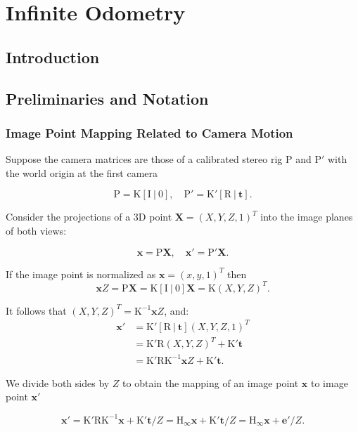 \chapter{Infinite Odometry}

\section{Introduction}


\section{Preliminaries and Notation}

\subsection{Image Point Mapping Related to Camera Motion}

Suppose the camera matrices are those of a calibrated stereo rig
$\mathrm{P}$ and $\mathrm{P}'$ with the world origin at the first
camera

\begin{equation}
\mathrm{P = K[I\ |\ 0],\quad P'=K'[R\ |\ \mathbf{t}]}.
\end{equation}

Consider the projections of a 3D point $\mathbf{X}=(X,Y,Z,1)^T$ into the image
planes of both views:

\begin{equation}
\mathrm{\mathbf{x} = P\mathbf{X}, \quad \mathbf{x}' = P'\mathbf{X}}.
\end{equation}

If the image point is normalized as $\mathbf{x} = (x,y,1)^T$ then
\[
\mathbf{x}Z = \mathrm{P\mathbf{X} = K[I\ |\ 0]\mathbf{X} = K}(X,Y,Z)^T.
\]

It follows that $(X,Y,Z)^T = \mathrm{K^{-1}}\mathbf{x}Z$, and:
\begin{align}
  \mathbf{x}' &= \mathrm{K'[R\ |\ \mathbf{t}]}(X,Y,Z,1)^T \\
  &= \mathrm{K'R}(X,Y,Z)^T + \mathrm{K'\mathbf{t}}\\
  &= \mathrm{K'RK^{-1}}\mathbf{x}Z + \mathrm{K'\mathbf{t}}.
\end{align}

We divide both sides by $Z$ to obtain the mapping of an image point $\mathbf{x}$ to image point $\mathbf{x}'$

\begin{equation}
  \label{eq:general_point_motion}
  \mathbf{x}' = \mathrm{K'RK^{-1}}\mathbf{x} + \mathrm{K'}\mathbf{t}/Z = \mathrm{H_\infty}\mathbf{x}+ \mathrm{K'}\mathbf{t}/Z = \mathrm{H_\infty}\mathbf{x} + \mathbf{e'}/Z.
\end{equation}

